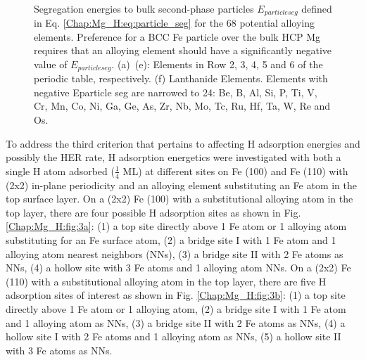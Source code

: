 \begin{figure}[!ht]
  \\
  \label{Chap:Mg_H:fig:5e}
  \label{Chap:Mg_H:fig:5f}
\caption[Segregation energies to bulk second-phase particles]{Segregation energies to bulk second-phase particles $E_{particle seg}$ defined in Eq. \ref{Chap:Mg_H:eq:particle_seg} for the 68 potential alloying elements. Preference for a \ac{BCC} Fe particle over the bulk \ac{HCP} Mg requires that an alloying element should have a significantly negative value of $E_{particle seg}$. (a)~(e): Elements in Row 2, 3, 4, 5 and 6 of the periodic table, respectively. (f) Lanthanide Elements. Elements with negative Eparticle seg are narrowed to 24: Be, B, Al, Si, P, Ti, V, Cr, Mn, Co, Ni, Ga, Ge, As, Zr, Nb, Mo, Tc, Ru, Hf, Ta, W, Re and Os.}
  \label{Chap:Mg_H:fig5}
\end{figure}
\endgroup

To address the third criterion that pertains to affecting H adsorption energies and possibly the HER rate, H adsorption energetics were investigated with both a single H atom adsorbed ($\frac{1}{4}$ \ac{ML}) at different sites on Fe (100) and Fe (110) with (2x2) in-plane periodicity and an alloying element substituting an Fe atom in the top surface layer. On a (2x2) Fe (100) with a substitutional alloying atom in the top layer, there are four possible H adsorption sites as shown in Fig. \ref{Chap:Mg_H:fig:3a}: (1) a top site directly above 1 Fe atom or 1 alloying atom substituting for an Fe surface atom, (2) a bridge site I with 1 Fe atom and 1 alloying atom nearest neighbors (NNs), (3) a bridge site II with 2 Fe atoms as NNs, (4) a hollow site with 3 Fe atoms and 1 alloying atom NNs. On a (2x2) Fe (110) with a substitutional alloying atom in the top layer, there are five H adsorption sites of interest as shown in Fig. \ref{Chap:Mg_H:fig:3b}: (1) a top site directly above 1 Fe atom or 1 alloying atom, (2) a bridge site I with 1 Fe atom and 1 alloying atom as NNs, (3) a bridge site II with 2 Fe atoms as NNs, (4) a hollow site I with 2 Fe atoms and 1 alloying atom as NNs, (5) a hollow site II with 3 Fe atoms as NNs.

